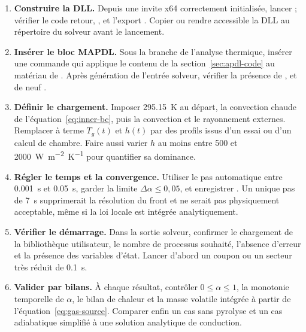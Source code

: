 \documentclass[oneside,openany]{amsdtx}
\begin{document}
\begin{enumerate}[leftmargin=2.2em,label=\textbf{\arabic*.}]
  \item \textbf{Construire la DLL.} Depuis une invite x64 correctement
  initialisée, lancer ; vérifier le code retour,
  ,  et l'export . Copier ou
  rendre accessible la DLL au répertoire du solveur avant le lancement.

  \item \textbf{Insérer le bloc MAPDL.} Sous la branche de l'analyse thermique,
  insérer une commande qui applique le contenu de la
  section~\ref{sec:apdl-code} au
  matériau de . Après génération de l'entrée solveur, vérifier la
  présence de ,  et de neuf .

  \item \textbf{Définir le chargement.} Imposer \SI{295.15}{K} au départ, la
  convection chaude de l'équation~\eqref{eq:inner-bc}, puis la convection et le
  rayonnement externes. Remplacer à terme \(T_g(t)\) et \(h(t)\) par des profils
  issus d'un essai ou d'un calcul de chambre. Faire aussi varier \(h\) au moins
  entre 500 et \SI{2000}{W.m^{-2}.K^{-1}} pour quantifier sa dominance.

  \item \textbf{Régler le temps et la convergence.} Utiliser le pas automatique
  entre \SI{0.001}{s} et \SI{0.05}{s}, garder la limite
  \(\Delta\alpha\le0{,}05\), et enregistrer . Un unique pas de
  \SI{7}{s} supprimerait la résolution du front et ne serait pas physiquement
  acceptable, même si la loi locale est intégrée analytiquement.

  \item \textbf{Vérifier le démarrage.} Dans la sortie solveur, confirmer le
  chargement de la bibliothèque utilisateur, le nombre de processus souhaité,
  l'absence d'erreur  et la présence des variables d'état.
  Lancer d'abord un coupon ou un secteur très réduit de \SI{0.1}{s}.

  \item \textbf{Valider par bilans.} À chaque résultat, contrôler
  \(0\le\alpha\le1\), la monotonie temporelle de \(\alpha\), le bilan de chaleur
  et la masse volatile intégrée à partir de l'équation~\eqref{eq:gas-source}.
  Comparer enfin un cas sans pyrolyse et un cas adiabatique simplifié à une
  solution analytique de conduction.
\end{enumerate}
\end{document}
